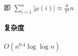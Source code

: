 即 \(\displaystyle \sum_{i=1}^n|\mu(i)|\approx\frac{6}{\pi^2}n\)

\paragraph{复杂度} \(O(n^{0.4}\log\log n)\)
